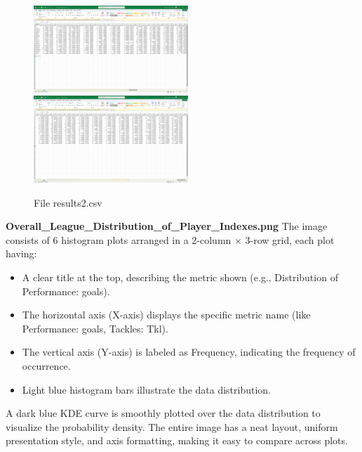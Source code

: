 \documentclass[12pt]{report}
\begin{document}
{{\begin{itemize}
\end{itemize}
\begin{figure}[h]
    \centering
    \includegraphics[width=220px]{results2.png}
    \includegraphics[width=220px]{results2_1.png}
    \caption{File results2.csv} %
    \label{fig:res2}
\end{figure}
\textbf{Overall\_League\_Distribution\_of\_Player\_Indexes.png} %
The image consists of 6 histogram plots arranged in a 2-column × 3-row grid, each plot having: %
\begin{itemize}
	\item A clear title at the top, describing the metric shown (e.g., Distribution of Performance: goals).
	\item The horizontal axis (X-axis) displays the specific metric name (like Performance: goals, Tackles: Tkl).
	\item The vertical axis (Y-axis) is labeled as Frequency, indicating the frequency of occurrence.
	\item Light blue histogram bars illustrate the data distribution.
\end{itemize}
A dark blue KDE curve is smoothly plotted over the data distribution to visualize the probability density. The entire image has a neat layout, uniform presentation style, and axis formatting, making it easy to compare across plots.
\begin{figure}[h]
    \centering

\end{figure}}}
\end{document}
